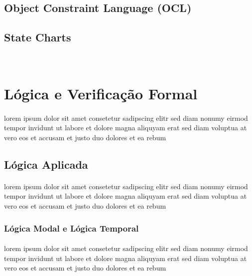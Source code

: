 \subsection{Object Constraint Language (OCL)}
\paragraph{}
\lipsum[1]

\subsection{State Charts}
\paragraph{}
~\cite{Harel:1987:SVF:34884.34886}


\section{Lógica e Verificação Formal}
\paragraph{}
lorem ipsum dolor sit amet consetetur sadipscing elitr sed diam nonumy
eirmod tempor invidunt ut labore et dolore magna aliquyam erat sed diam
voluptua at vero eos et accusam et justo duo dolores et ea rebum

\subsection{Lógica Aplicada}
\paragraph{}
lorem ipsum dolor sit amet consetetur sadipscing elitr sed diam nonumy
eirmod tempor invidunt ut labore et dolore magna aliquyam erat sed diam
voluptua at vero eos et accusam et justo duo dolores et ea rebum

\subsubsection{Lógica Modal e Lógica Temporal}
\paragraph{}
lorem ipsum dolor sit amet consetetur sadipscing elitr sed diam nonumy
eirmod tempor invidunt ut labore et dolore magna aliquyam erat sed diam
voluptua at vero eos et accusam et justo duo dolores et ea rebum

